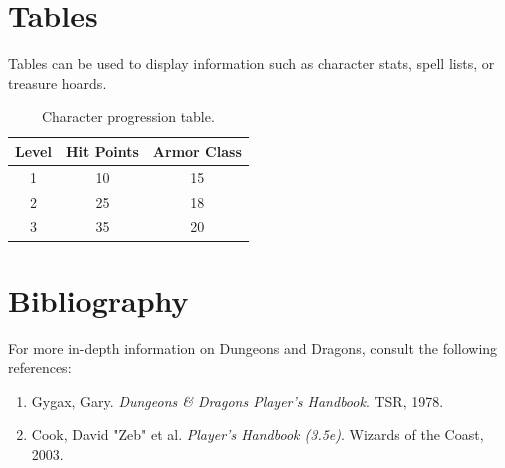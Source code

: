 

    \chapter{Tables}\label{ch:tables}
    Tables can be used to display information such as character stats, spell lists, or treasure hoards.

    \begin{table}[h]
        \centering
        \begin{tabular}{|c|c|c|}
            \hline
            Level & Hit Points & Armor Class \\
            \hline
            1     & 10         & 15          \\
            2     & 25         & 18          \\
            3     & 35         & 20          \\
            \hline
        \end{tabular}
        \caption{Character progression table.}\label{tab:table}
    \end{table}


    \chapter{Bibliography}\label{ch:bibliography}
    For more in-depth information on Dungeons and Dragons, consult the following references:

    \begin{enumerate}
        \item Gygax, Gary. \textit{Dungeons & Dragons Player's Handbook}. TSR, 1978.
        \item Cook, David "Zeb" et al. \textit{Player's Handbook (3.5e)}. Wizards of the Coast, 2003.
    \end{enumerate}


